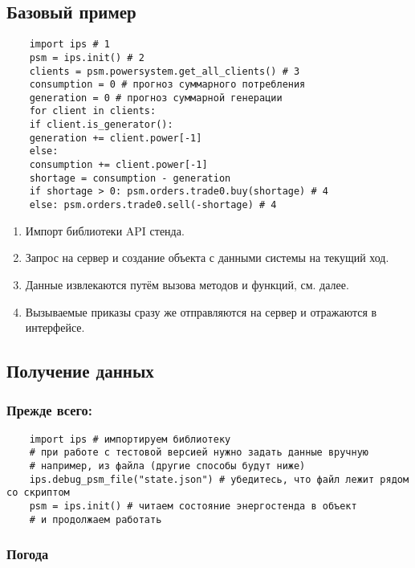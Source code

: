 \subsection*{Базовый пример}

\begin{verbatim}
    import ips # 1 
    psm = ips.init() # 2 
    clients = psm.powersystem.get_all_clients() # 3 
    consumption = 0 # прогноз суммарного потребления 
    generation = 0 # прогноз суммарной генерации 
    for client in clients: 
    if client.is_generator(): 
    generation += client.power[-1] 
    else: 
    consumption += client.power[-1]
    shortage = consumption - generation 
    if shortage > 0: psm.orders.trade0.buy(shortage) # 4 
    else: psm.orders.trade0.sell(-shortage) # 4 
\end{verbatim}

\begin{enumerate}
    \item Импорт библиотеки API стенда. 
    \item Запрос на сервер и создание объекта с данными системы на текущий ход. 
    \item Данные извлекаются путём вызова методов и функций, см. далее. 
    \item Вызываемые приказы сразу же отправляются на сервер и отражаются в интерфейсе.         
\end{enumerate}

\subsection*{Получение данных}

\subsubsection*{Прежде всего:}

\begin{verbatim}
    import ips # импортируем библиотеку 
    # при работе с тестовой версией нужно задать данные вручную 
    # например, из файла (другие способы будут ниже) 
    ips.debug_psm_file("state.json") # убедитесь, что файл лежит рядом со скриптом 
    psm = ips.init() # читаем состояние энергостенда в объект 
    # и продолжаем работать 
\end{verbatim}

\subsubsection*{Погода}

